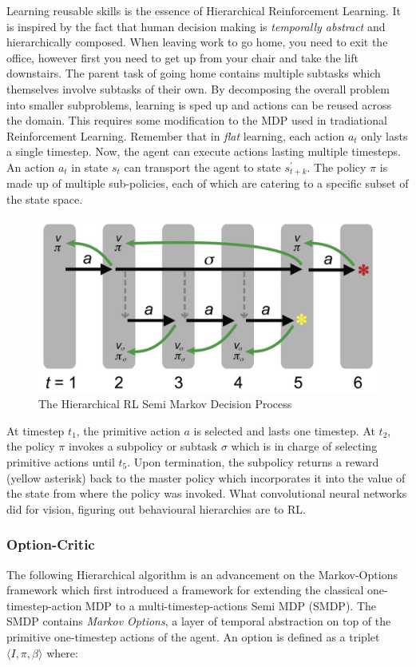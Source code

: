 \documentclass[notitlepage,a4paper,11pt]{article}
\begin{document}
Learning reusable skills is the essence of Hierarchical Reinforcement Learning. It is inspired by the fact that human decision making is \textit{temporally abstract} \cite{sutton1999between} and hierarchically composed. When leaving work to go home, you need to exit the office, however first you need to get up from your chair and take the lift downstairs. The parent task of going home contains multiple subtasks which themselves involve subtasks of their own. By decomposing the overall problem into smaller subproblems, learning is sped up and actions can be reused across the domain. This requires some modification to the MDP used in tradiational Reinforcement Learning. Remember that in \textit{flat} learning, each action $a_t$ only lasts a single timestep. Now, the agent can execute actions lasting multiple timesteps. An action $a_t$ in state $s_t$ can transport the agent to state $s^{\prime}_{t+k}$. The policy $\pi$ is made up of multiple sub-policies, each of which are catering to a specific subset of the state space. 

\begin{figure}[!htb]
\centering
\includegraphics[width=.5\linewidth]{figs/hrl_smdp.png}
\caption{The Hierarchical RL Semi Markov Decision Process \protect\cite{ribas2011neural}} \label{fig:3}
\end{figure}

At timestep $t_1$, the primitive action $a$ is selected and lasts one timestep. At $t_2$, the policy $\pi$ invokes a subpolicy or subtask $\sigma$ which is in charge of selecting primitive actions until $t_5$. Upon termination, the subpolicy returns a reward (yellow asterisk) back to the master policy which incorporates it into the value of the state from where the policy was invoked. What convolutional neural networks did for vision, figuring out behavioural hierarchies are to RL.

\subsubsection{Option-Critic}
The following Hierarchical algorithm is an advancement on the Markov-Options framework \cite{sutton1999between} which first introduced a framework for extending the classical one-timestep-action MDP to a multi-timestep-actions Semi MDP (SMDP). The SMDP contains \textit{Markov Options}, a layer of temporal abstraction on top of the primitive one-timestep actions of the agent. An option is defined as a triplet $\langle I, \pi, \beta \rangle$ where:
\end{document}
